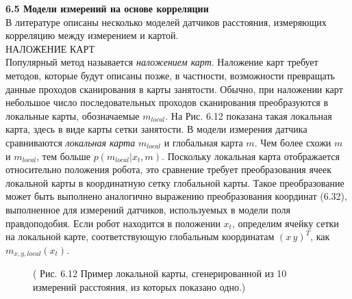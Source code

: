\documentclass[10pt,a4paper]{article}
\begin{document}
\textbf{6.5 Модели измерений на основе корреляции} \\

В литературе описаны несколько моделей датчиков расстояния, измеряющих корреляцию между измерением и картой.\\
НАЛОЖЕНИЕ КАРТ\\ Популярный метод
называется \textit{наложением карт}. Наложение карт требует методов, которые будут описаны позже, в частности, возможности превращать данные проходов сканирования в карты занятости. Обычно, при наложении карт небольшое число последовательных проходов сканирования преобразуются в локальные карты, обозначаемые $m_{local}$. На Рис. 6.12 показана такая локальная карта, здесь в виде карты сетки занятости. В модели измерения датчика сравниваются \textit{локальная карта} $m_{local}$ и глобальная карта $m$. Чем более схожи $m$ и $m_{local}$, тем больше $p(m_{local} | x_t, m)$. Поскольку локальная карта отображается относительно положения робота, это сравнение требует преобразования ячеек локальной карты в координатную сетку глобальной карты. 
Такое преобразование может быть выполнено аналогично выражению преобразования координат (6.32), выполненное для измерений датчиков, используемых в модели поля правдоподобия. Если робот находится в положении $x_t$, определим  ячейку сетки на локальной карте, соответствующую глобальным координатам $(x\,y)^T$, как $m_{x,y,local}(x_t)$. 

\begin{figure}[H]
	\caption{ (  Рис. 6.12 Пример локальной карты, сгенерированной из 10 измерений расстояния, из которых показано одно.)}
	\label{fig:612orig}
\end{figure}
\end{document}
